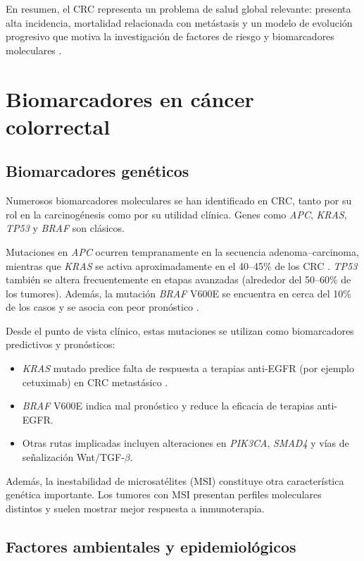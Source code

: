 \documentclass[11pt]{article}
\begin{document}
En resumen, el CRC representa un problema de salud global relevante: presenta alta incidencia, mortalidad relacionada con metástasis y un modelo de evolución progresivo que motiva la investigación de factores de riesgo y biomarcadores moleculares \cite{ref1,ref4}.

\section{Biomarcadores en cáncer colorrectal}

\subsection{Biomarcadores genéticos}

Numerosos biomarcadores moleculares se han identificado en CRC, tanto por su rol en la carcinogénesis como por su utilidad clínica. Genes como \textit{APC}, \textit{KRAS}, \textit{TP53} y \textit{BRAF} son clásicos.

Mutaciones en \textit{APC} ocurren tempranamente en la secuencia adenoma--carcinoma, mientras que \textit{KRAS} se activa aproximadamente en el 40--45\% de los CRC \cite{ref5}. \textit{TP53} también se altera frecuentemente en etapas avanzadas (alrededor del 50--60\% de los tumores). Además, la mutación \textit{BRAF} V600E se encuentra en cerca del 10\% de los casos y se asocia con peor pronóstico \cite{ref6}.

Desde el punto de vista clínico, estas mutaciones se utilizan como biomarcadores predictivos y pronósticos:

\begin{itemize}
\item \textit{KRAS} mutado predice falta de respuesta a terapias anti-EGFR (por ejemplo cetuximab) en CRC metastásico \cite{ref6,ref5}.
\item \textit{BRAF} V600E indica mal pronóstico y reduce la eficacia de terapias anti-EGFR.
\item Otras rutas implicadas incluyen alteraciones en \textit{PIK3CA}, \textit{SMAD4} y vías de señalización Wnt/TGF-$\beta$.
\end{itemize}

Además, la inestabilidad de microsatélites (MSI) constituye otra característica genética importante. Los tumores con MSI presentan perfiles moleculares distintos y suelen mostrar mejor respuesta a inmunoterapia.

\subsection{Factores ambientales y epidemiológicos}
\end{document}
